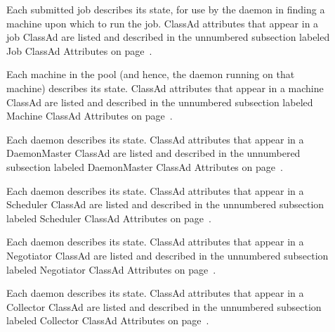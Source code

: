 \begin{description}
  \item[]
  Each submitted job describes its state, for use by the
   daemon in finding a machine upon which to
  run the job.
  ClassAd attributes that appear in a job ClassAd are listed and described in
  the unnumbered subsection labeled Job ClassAd Attributes
  on page~\pageref{sec:Job-ClassAd-Attributes}.

  \item[]
   Each machine in the pool (and hence, the  daemon running
   on that machine) describes its state.
  ClassAd attributes that appear in a machine ClassAd 
  are listed and described in
  the unnumbered subsection labeled Machine ClassAd Attributes
  on page~\pageref{sec:Machine-ClassAd-Attributes}.

  \item[]
   Each  daemon describes its state.
  ClassAd attributes that appear in a DaemonMaster ClassAd 
  are listed and described in
  the unnumbered subsection labeled DaemonMaster ClassAd Attributes
  on page~\pageref{sec:DaemonMaster-ClassAd-Attributes}.

  \item[]
   Each  daemon describes its state.
  ClassAd attributes that appear in a Scheduler ClassAd 
  are listed and described in
  the unnumbered subsection labeled Scheduler ClassAd Attributes
  on page~\pageref{sec:Scheduler-ClassAd-Attributes}.

  \item[]
   Each  daemon describes its state.
  ClassAd attributes that appear in a Negotiator ClassAd 
  are listed and described in
  the unnumbered subsection labeled Negotiator ClassAd Attributes
  on page~\pageref{sec:Negotiator-ClassAd-Attributes}.

  \item[]
   Each  daemon describes its state.
  ClassAd attributes that appear in a Collector ClassAd 
  are listed and described in
  the unnumbered subsection labeled Collector ClassAd Attributes
  on page~\pageref{sec:Collector-ClassAd-Attributes}.

  \item[]
  \Todo

\end{description}

